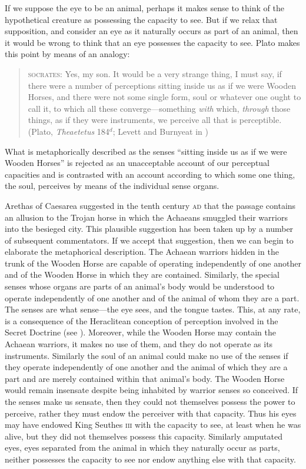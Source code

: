 If we suppose the eye to be an animal, perhaps it makes sense to think of the hypothetical creature as possessing the capacity to see. But if we relax that supposition, and consider an eye as it naturally occurs as part of an animal, then it would be wrong to think that an eye possesses the capacity to see. Plato makes this point by means of an analogy: 
\begin{quote}
	\textsc{socrates}: Yes, my son. It would be a very strange thing, I must say, if there were a number of perceptions sitting inside us as if we were Wooden Horses, and there were not some single form, soul or whatever one ought to call it, to which all these converge---something \emph{with} which, \emph{through} those things, as if they were instruments, we perceive all that is perceptible. (Plato, \emph{Theaetetus} 184\( ^{d} \); Levett and Burnyeat in \citealt[204]{Cooper:1997fk})
\end{quote}
What is metaphorically described as the senses ``sitting inside us as if we were Wooden Horses'' is rejected as an unacceptable account of our perceptual capacities and is contrasted with an account according to which some one thing, the soul, perceives by means of the individual sense organs. 

Arethas of Caesarea suggested in the tenth century \textsc{ad} that the passage contains an allusion to the Trojan horse in which the Achaeans smuggled their warriors into the besieged city. This plausible suggestion has been taken up by a number of subsequent commentators. If we accept that suggestion, then we can begin to elaborate the metaphorical description. The Achaean warriors hidden in the trunk of the Wooden Horse are capable of operating independently of one another and of the Wooden Horse in which they are contained. Similarly, the special senses whose organs are parts of an animal's body would be understood to operate independently of one another and of the animal of whom they are a part. The senses are what sense---the eye sees, and the tongue tastes. This, at any rate, is a consequence of the Heraclitean conception of perception involved in the Secret Doctrine (see \citealt[30--31]{Burnyeat:1976ab}). Moreover, while the Wooden Horse may contain the Achaean warriors, it makes no use of them, and they do not operate as its instruments. Similarly the soul of an animal could make no use of the senses if they operate independently of one another and the animal of which they are a part and are merely contained within that animal's body. The Wooden Horse would remain insensate despite being inhabited by warrior senses so conceived. If the senses make us sensate, then they could not themselves possess the power to perceive, rather they must endow the perceiver with that capacity. Thus his eyes may have endowed King Seuthes \textsc{iii} with the capacity to see, at least when he was alive, but they did not themselves possess this capacity. Similarly amputated eyes, eyes separated from the animal in which they naturally occur as parts, neither possesses the capacity to see nor endow anything else with that capacity. 

